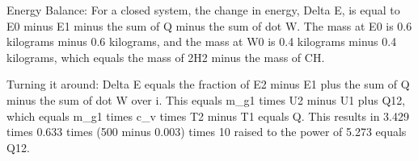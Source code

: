 Energy Balance:
For a closed system, the change in energy, Delta E, is equal to E0 minus E1 minus the sum of Q minus the sum of dot W. The mass at E0 is 0.6 kilograms minus 0.6 kilograms, and the mass at W0 is 0.4 kilograms minus 0.4 kilograms, which equals the mass of 2H2 minus the mass of CH.

Turning it around:
Delta E equals the fraction of E2 minus E1 plus the sum of Q minus the sum of dot W over i. This equals m_g1 times U2 minus U1 plus Q12, which equals m_g1 times c_v times T2 minus T1 equals Q. This results in 3.429 times 0.633 times (500 minus 0.003) times 10 raised to the power of 5.273 equals Q12.
